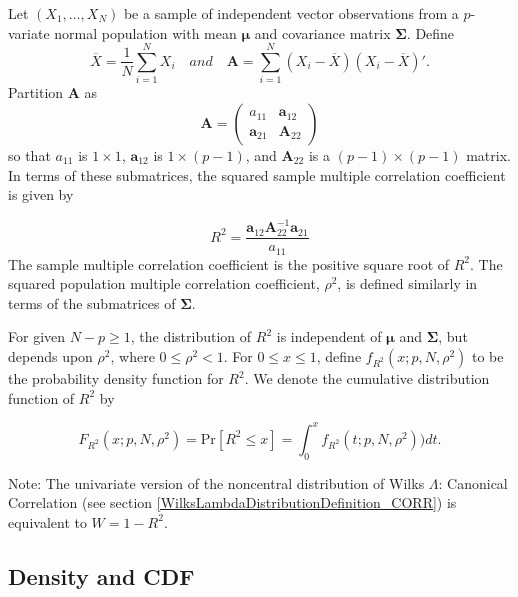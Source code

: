 Let $(X_1, \ldots, X_N)$ be a sample of independent vector observations from a  $p$-variate normal population with mean $\boldsymbol{\mu}$ and covariance matrix $\boldsymbol{\Sigma}$. Define
\begin{equation}
	\overline{X} = \frac{1}{N} \sum_{i=1}^N X_i \quad and \quad \textbf{A} = \sum_{i=1}^N (X_i - \overline{X}) (X_i - \overline{X})'.
\end{equation}
Partition $\textbf{A}$ as
\begin{equation}
	\textbf{A} =
	\begin{pmatrix}
		a_{11} & \textbf{a}_{12} \\
		\textbf{a}_{21} & \textbf{A}_{22} 
	\end{pmatrix}
\end{equation}
so that $a_{11}$ is $1 \times 1$, $\textbf{a}_{12}$ is $1 \times (p-1)$, and $\textbf{A}_{22}$ is a $(p-1) \times (p-1)$ matrix. In terms of these submatrices, the squared sample multiple correlation coefficient is given by

\begin{equation}
	R^2 = \frac{\textbf{a}_{12} \textbf{A}_{22}^{-1} \textbf{a}_{21}}{a_{11}}
\end{equation}
The sample multiple correlation coefficient is the positive square root of $R^2$. The squared population multiple correlation coefficient, $\rho^2$, is defined similarly in terms of the submatrices of $\boldsymbol{\Sigma}$.

For given $N-p \geq 1$, the distribution of $R^2$ is independent of $\boldsymbol{\mu}$ and $\boldsymbol{\Sigma}$, but depends upon  $\rho^2$, where $0 \leq \rho^2 < 1$.
For $0 \leq x \leq 1$, define $f_{R^2}(x;p,N,\rho^2)$ to be the probability density function for $R^2$. We denote the cumulative distribution function of $R^2$ by

\begin{equation}
	F_{R^2}(x;p,N,\rho^2) = \text{Pr}[R^2 \leq x] = \int_{0}^{x}{f_{R^2}(t;p,N,\rho^2)) dt}.
\end{equation}


Note: The univariate version of the noncentral distribution of Wilks $\Lambda$: Canonical Correlation 
(see section \ref{WilksLambdaDistributionDefinition_CORR})
is equivalent to $W=1-R^2$.




\subsection{Density and CDF}

